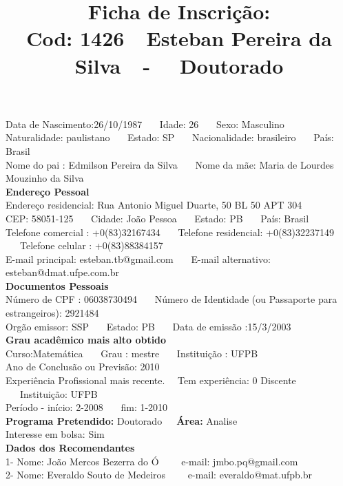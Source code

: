 \documentclass[11pt]{article}
\title{\vspace*{-4cm} Ficha de Inscrição: \\Cod: 1426\ \ Esteban Pereira da Silva\ \ - \ \ Doutorado 
 }
\date{}
\begin{document}
\maketitle
\vspace*{-1.5cm}
\noindent Data de Nascimento:26/10/1987
\ \ \ Idade: 26   \ \ \ Sexo: Masculino
\\
Naturalidade: paulistano  
\ \ \  Estado: SP
\ \ \  Nacionalidade: brasileiro
\ \ \ País: Brasil
\\        
Nome do pai : Edmilson Pereira da Silva
\ \ \ Nome da mãe: Maria de Lourdes Mouzinho da Silva          
\\[0.2cm]                     
\textbf{Endereço Pessoal} 
\\ 
\noindent Endereço residencial: Rua Antonio Miguel Duarte, 50 BL 50 APT 304
\\
        CEP: 58051-125 
\ \ \ Cidade: João Pessoa 
\ \ \ Estado: PB 
\ \ \ País: Brasil
\\		
		Telefone comercial : +0(83)32167434
\ \ \ Telefone residencial: +0(83)32237149
\ \ \ Telefone celular : +0(83)88384157
\\
E-mail principal: esteban.tb@gmail.com
\ \ \ E-mail alternativo: esteban@dmat.ufpe.com.br 
\\[0.2cm] 
\textbf{Documentos Pessoais}
\\
\noindent Número de CPF : 06038730494
\ \ \ Número de Identidade (ou Passaporte para estrangeiros): 2921484
\\
Orgão emissor: SSP
\ \ \ Estado: PB
\ \ \ Data de emissão :15/3/2003
\\[0.3cm]
\textbf{Grau acadêmico mais alto obtido}
\\	
Curso:Matemática
\ \ \ Grau : mestre
\ \ \ Instituição : UFPB
\\			
Ano de Conclusão ou Previsão: 2010
\\ 
Experiência Profissional mais recente. \ \  
Tem experiência: 0 Discente  
\ \ \ Instituição: UFPB
\\  
Período - início: 2-2008
\ \ \ fim: 1-2010
\\[0.2cm] 
\textbf{Programa Pretendido:} Doutorado\ \ \ \textbf{Área:} Analise\\
Interesse em bolsa: Sim
\\[0.3cm]		
\textbf{Dados dos Recomendantes} 
\\
1- Nome: João Mercos Bezerra do Ó
\ \ \ \  e-mail: jmbo.pq@gmail.com 
\\
2- Nome: Everaldo Souto de Medeiros
\ \ \ \ e-mail: everaldo@mat.ufpb.br
\end{document}
